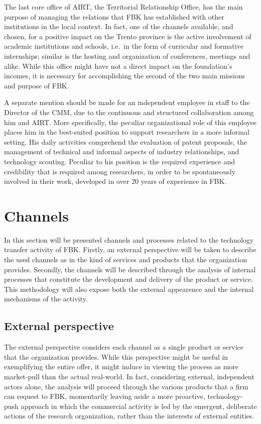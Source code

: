 The last core office of AIRT, the Territorial Relationship Office, has the main purpose of managing the relations that FBK has established with other institutions in the local context. In fact, one of the channels available, and chosen, for a positive impact on the Trento province is the active involvement of academic institutions and schools, i.e.\ in the form of curricular and formative internships; similar is the hosting and organization of conferences, meetings and alike. While this office might have not a direct impact on the foundation's incomes, it is necessary for accomplishing the second of the two main missions and purpose of FBK.

A separate mention should be made for an independent employee in staff to the Director of the CMM, due to the continuous and structured collaboration among him and AIRT. More specifically, the peculiar organizational role of this employee places him in the best-suited position to support researchers in a more informal setting. His daily activities comprehend the evaluation of patent proposals, the management of technical and informal aspects of industry relationships, and technology scouting. Peculiar to his position is the required experience and credibility that is required among researchers, in order to be spontaneously involved in their work, developed in over 20 years of experience in FBK.

\section{Channels}

In this section will be presented channels and processes related to the technology transfer activity of FBK. Firstly, an external perspective will be taken to describe the used channels as in the kind of services and products that the organization provides. Secondly, the channels will be described through the analysis of internal processes that constitute the development and delivery of the product or service. This methodology will also expose both the external appearence and the internal mechanisms of the activity. 

\subsection{External perspective}

The external perspective considers each channel as a single product or service that the organization provides. While this perspective might be useful in exemplifying the entire offer, it might induce in viewing the process as more market-pull than the actual real-world. In fact, considering external, independent actors alone, the analysis will proceed through the various products that a firm can request to FBK, momentarily leaving aside a more proactive, technology-push approach in which the commercial activity is led by the emergent, deliberate actions of the research organization, rather than the interests of external entities.

